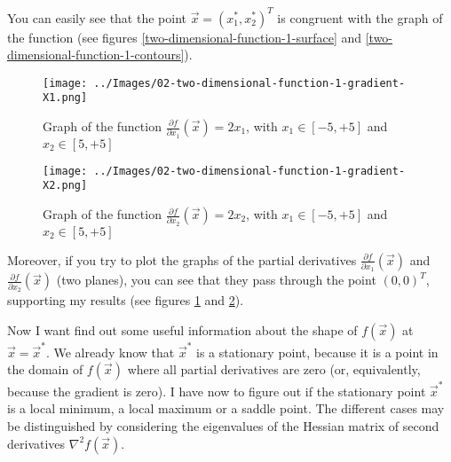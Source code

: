     You can easily see that the point \(\vec{x} = (x^{*}_{1}, x^{*}_{2})^T\) is congruent with the graph of the function (see figures \ref{two-dimensional-function-1-surface} and \ref{two-dimensional-function-1-contours}).
    \begin{figure}
        \centering
        \texttt{[image: ../Images/02-two-dimensional-function-1-gradient-X1.png]}
        \caption{Graph of the function \(\frac{\partial f}{\partial x_1}(\vec{x}) = 2x_1\), with \(x_1 \in [-5, +5]\) and \(x_2 \in [5, +5]\)}
        \label{two-dimensional-function-1-gradient-X1}
    \end{figure}
    \begin{figure}
        \centering
        \texttt{[image: ../Images/02-two-dimensional-function-1-gradient-X2.png]}
        \caption{Graph of the function \(\frac{\partial f}{\partial x_2}(\vec{x}) = 2x_2\), with \(x_1 \in [-5, +5]\) and \(x_2 \in [5, +5]\)}
        \label{two-dimensional-function-1-gradient-X2}
    \end{figure}
    Moreover, if you try to plot the graphs of the partial derivatives \(\frac{\partial f}{\partial x_1}(\vec{x})\) and \(\frac{\partial f}{\partial x_2}(\vec{x})\) (two planes), you can see that they pass through the point \((0, 0)^T\), supporting my results (see figures \ref{two-dimensional-function-1-gradient-X1} and \ref{two-dimensional-function-1-gradient-X2}).\par
    Now I want find out some useful information about the shape of \(f(\vec{x})\) at \(\vec{x} = \vec{x}^*\). We already know that \(\vec{x}^*\) is a stationary point, because it is a point in the domain of \(f(\vec{x})\) where all partial derivatives are zero (or, equivalently, because the gradient is zero). I have now to figure out if the stationary point \(\vec{x}^*\) is a local minimum, a local maximum or a saddle point. The different cases may be distinguished by considering the eigenvalues of the Hessian matrix of second derivatives \(\nabla^2 f(\vec{x})\).
